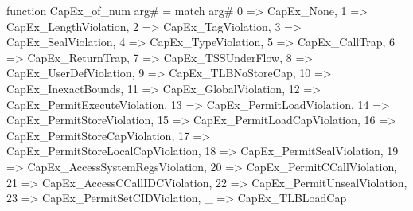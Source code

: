 function CapEx_of_num arg# = match arg# {
  0 => CapEx_None,
  1 => CapEx_LengthViolation,
  2 => CapEx_TagViolation,
  3 => CapEx_SealViolation,
  4 => CapEx_TypeViolation,
  5 => CapEx_CallTrap,
  6 => CapEx_ReturnTrap,
  7 => CapEx_TSSUnderFlow,
  8 => CapEx_UserDefViolation,
  9 => CapEx_TLBNoStoreCap,
  10 => CapEx_InexactBounds,
  11 => CapEx_GlobalViolation,
  12 => CapEx_PermitExecuteViolation,
  13 => CapEx_PermitLoadViolation,
  14 => CapEx_PermitStoreViolation,
  15 => CapEx_PermitLoadCapViolation,
  16 => CapEx_PermitStoreCapViolation,
  17 => CapEx_PermitStoreLocalCapViolation,
  18 => CapEx_PermitSealViolation,
  19 => CapEx_AccessSystemRegsViolation,
  20 => CapEx_PermitCCallViolation,
  21 => CapEx_AccessCCallIDCViolation,
  22 => CapEx_PermitUnsealViolation,
  23 => CapEx_PermitSetCIDViolation,
  _ => CapEx_TLBLoadCap
}
